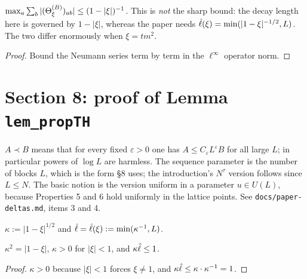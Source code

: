 \begin{lemma}\label{lem:crude}
  \leanok
  $\max_a\sum_b|(\Theta^{(B)}_\xi)_{ab}|\le(1-|\xi|)^{-1}$.  This is \emph{not} the
  sharp bound: the decay length here is governed by $1-|\xi|$, whereas the paper
  needs $\hat\ell(\xi)=\min(|1-\xi|^{-1/2},L)$.  The two differ enormously when
  $\xi=tm^2$.
\end{lemma}
\begin{proof}\leanok
  Bound the Neumann series term by term in the $\ell^\infty$ operator norm.
\end{proof}

\chapter{Section 8: proof of Lemma \texorpdfstring{\texttt{lem\_propTH}}{lem-propTH}}

\begin{definition}
  \label{def:detdom}
  \leanok
  $A\prec B$ means that for every fixed $\varepsilon>0$ one has
  $A\le C_\varepsilon L^{\varepsilon}B$ for all large $L$; in particular powers of
  $\log L$ are harmless.  The sequence parameter is the number of blocks $L$,
  which is the form \S8 uses; the introduction's $N^{\tau}$ version follows since
  $L\le N$.  The basic notion is the version uniform in a parameter
  $u\in U(L)$, because Properties 5 and 6 hold uniformly in the lattice points.
  See \texttt{docs/paper-deltas.md}, items 3 and 4.
\end{definition}


\begin{definition}\label{def:kappa}
  \leanok
  $\kappa:=|1-\xi|^{1/2}$ and $\hat\ell=\hat\ell(\xi):=\min(\kappa^{-1},L)$.
\end{definition}

\begin{lemma}\label{lem:kappa-basic}
  \leanok{}
  $\kappa^2=|1-\xi|$, $\kappa>0$ for $|\xi|<1$, and $\kappa\hat\ell\le1$.
\end{lemma}
\begin{proof}\leanok
  $\kappa>0$ because $|\xi|<1$ forces $\xi\ne1$, and
  $\kappa\hat\ell\le\kappa\cdot\kappa^{-1}=1$.
\end{proof}

